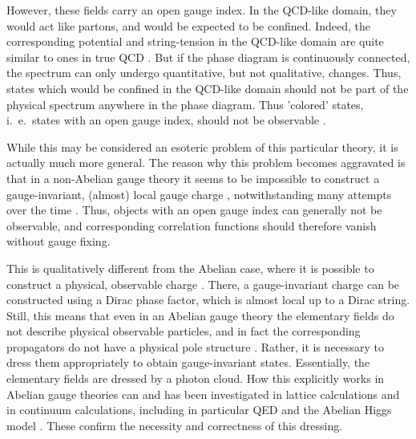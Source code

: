 \documentclass[final,12pt]{article}
\newcommand*{\1}{1\!\!\!\bot}
\begin{document}
However, these fields carry an open gauge index. In the QCD-like domain, they would act like partons, and would be expected to be confined. Indeed, the corresponding potential and string-tension in the QCD-like domain are quite similar to ones in true QCD \cite{Knechtli:1999qe,Knechtli:1998gf}. But if the phase diagram is continuously connected, the spectrum can only undergo quantitative, but not qualitative, changes. Thus, states which would be confined in the QCD-like domain should not be part of the physical spectrum anywhere in the phase diagram. Thus 'colored' states, i.\ e.\ states with an open gauge index, should not be observable \cite{'tHooft:1979bj,Banks:1979fi,Frohlich:1980gj}.

While this may be considered an esoteric problem of this particular theory, it is actually much more general. The reason why this problem becomes aggravated is that in a non-Abelian gauge theory it seems to be impossible to construct a gauge-invariant, (almost) local gauge charge \cite{Haag:1992hx,Ilderton:2007qy,Heinzl:2008bu,Strocchi:2013awa}, notwithstanding many attempts over the time \cite{Lavelle:1995ty,Polyakov:1978vu,Susskind:1979up,Gross:1980br,Marchesini:1981kt,Bagan:1999jf,Bagan:1999jk,Ilderton:2007qy,Lavelle:2011yc,Heinzl:2008bu}. Thus, objects with an open gauge index can generally not be observable, and corresponding correlation functions should therefore vanish without gauge fixing.

This is qualitatively different from the Abelian case, where it is possible to construct a physical, observable charge \cite{Frere:1974ia,Haag:1992hx,Heinzl:2008bu,Rubakov:2002fi}. There, a gauge-invariant charge can be constructed using a Dirac phase factor, which is almost local up to a Dirac string. Still, this means that even in an Abelian gauge theory the elementary fields do not describe physical observable particles, and in fact the corresponding propagators do not have a physical pole structure \cite{Maris:1996zg,Alkofer:2000wg}. Rather, it is necessary to dress them appropriately to obtain gauge-invariant states. Essentially, the elementary fields are dressed by a photon cloud. How this explicitly works in Abelian gauge theories can and has been investigated in lattice calculations and in continuum calculations, including in particular QED and the Abelian Higgs model \cite{Woloshyn:2017rhe,Evertz:1986ur,Fradkin:1978dv,Frere:1974ia,Haag:1992hx,Montvay:1994cy,Buchmuller:1995xm,Lavelle:2011yc,Lucini:2015hfa}. These confirm the necessity and correctness of this dressing.
\end{document}
